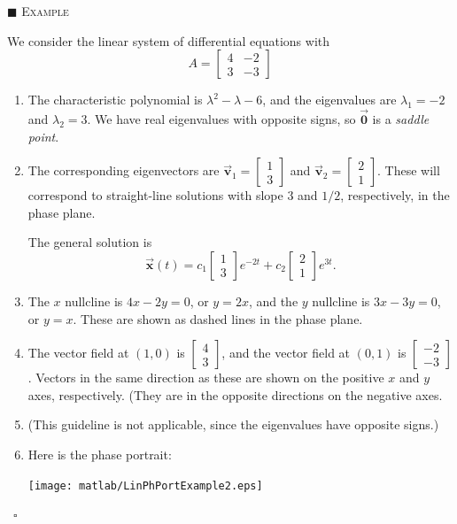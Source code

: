 \documentclass[reqno]{immbook}
\newcommand{\BV}{\vec{\textbf{v}}}
\newcommand{\BX}{\vec{\textbf{x}}}
\newcommand{\BZero}{\vec{\textbf{0}}}  %
\numberwithin{equation}{chapter}
\numberwithin{question}{section}
\numberwithin{theorem}{chapter}
\numberwithin{figure}{chapter}
\theoremstyle{definition}
\newenvironment{xexample}%
{%

\medskip\noindent\addtocounter{example}{1}$\blacksquare$ \textsc{Example \theexample}\hspace*{1em}%
}%
{%
~\hfill$\square$

\medskip
}
\begin{document}
\newpage

\begin{xexample}
We consider the linear system of differential equations
with
\[
   A = \begin{bmatrix}
            4 & -2 \\ 3 & -3
       \end{bmatrix}
\]
\begin{enumerate}
\item
The characteristic polynomial is
$\lambda^2 -\lambda -6$, and the eigenvalues are
$\lambda_1 = -2$ and $\lambda_2 = 3$.
We have real eigenvalues with opposite signs, so
$\BZero$ is a \emph{saddle point}.
\item
The corresponding eigenvectors are
$\BV_1 = \begin{bmatrix} 1 \\ 3 \end{bmatrix}$
and
$\BV_2 = \begin{bmatrix} 2 \\ 1 \end{bmatrix}$.
These will correspond to straight-line solutions with
slope $3$ and $1/2$, respectively, in the phase plane.

The general solution is
\begin{equation}
\BX(t) = c_1 \begin{bmatrix} 1 \\ 3 \end{bmatrix} e^{-2t}
   + c_2 \begin{bmatrix} 2 \\ 1 \end{bmatrix} e^{3t}.
\end{equation}
\item
The $x$ nullcline is $4x-2y=0$, or $y = 2x$, and the
$y$ nullcline is $3x-3y=0$, or $y=x$.  These are shown
as dashed lines in the phase plane.
\item
The vector field at $(1,0)$ is $\begin{bmatrix} 4 \\ 3 \end{bmatrix}$,
and the vector field at $(0,1)$
is $\begin{bmatrix} -2 \\ -3 \end{bmatrix}$.  Vectors in the
same direction as these are shown on the positive $x$ and $y$ axes,
respectively.
(They are in the opposite directions on the negative axes.
\item
(This guideline is not applicable, since the eigenvalues
have opposite signs.)
\item
Here is the phase portrait:

\noindent
\centerline{\texttt{[image: matlab/LinPhPortExample2.eps]}}
\end{enumerate}
\end{xexample}
\end{document}
